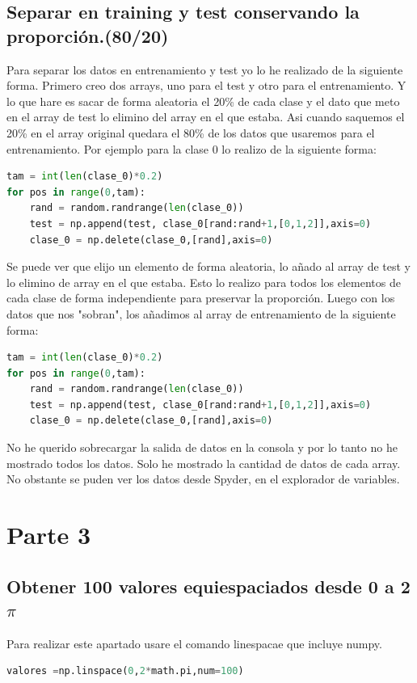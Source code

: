 \documentclass[12pt,a4paper]{article}
\begin{document}
\subsection{Separar en training y test conservando la proporción.(80/20)}
Para separar los datos en entrenamiento y test yo lo he realizado de la siguiente forma. Primero creo dos arrays, uno para el test y otro para el entrenamiento. Y lo que hare es sacar de forma aleatoria el 20\% de cada clase y el dato que meto en el array de test lo elimino del array en el que estaba. Asi cuando saquemos el 20\% en el array original quedara el 80\% de los datos que usaremos para el entrenamiento. Por ejemplo para la clase 0 lo realizo de la siguiente forma:
\begin{lstlisting}[language=Python]
tam = int(len(clase_0)*0.2)
for pos in range(0,tam):
    rand = random.randrange(len(clase_0))
    test = np.append(test, clase_0[rand:rand+1,[0,1,2]],axis=0)
    clase_0 = np.delete(clase_0,[rand],axis=0)
\end{lstlisting}
Se puede ver que elijo un elemento de forma aleatoria, lo añado al array de test y lo elimino de array en el que estaba. Esto lo realizo para todos los elementos de cada clase de forma independiente para preservar la proporción. Luego con los datos que nos "sobran", los añadimos al array de entrenamiento de la siguiente forma:
 \begin{lstlisting}[language=Python]
tam = int(len(clase_0)*0.2)
for pos in range(0,tam):
    rand = random.randrange(len(clase_0))
    test = np.append(test, clase_0[rand:rand+1,[0,1,2]],axis=0)
    clase_0 = np.delete(clase_0,[rand],axis=0)
\end{lstlisting}
No he querido sobrecargar la salida de datos en la consola y por lo tanto no he mostrado todos los datos. Solo he mostrado la cantidad de datos de cada array. No obstante se puden ver los datos desde Spyder, en el explorador de variables.
\section{Parte 3}
\subsection{Obtener 100 valores equiespaciados desde 0 a 2$\pi$}
Para realizar este apartado usare el comando linespacae que incluye numpy.
\begin{lstlisting}[language=Python]
valores =np.linspace(0,2*math.pi,num=100)
\end{lstlisting}
\end{document}
